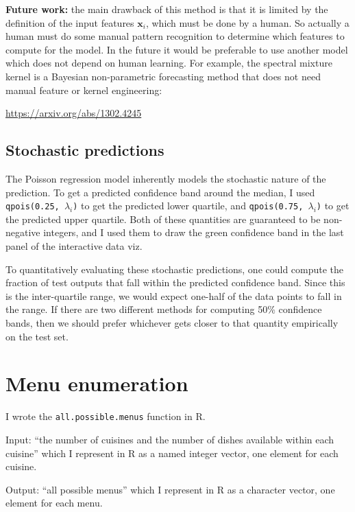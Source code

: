 \documentclass{article}
\begin{document}
\textbf{Future work:} the main drawback of this method is that it is
limited by the definition of the input features $\mathbf x_i$, which
must be done by a human. So actually a human must do some manual
pattern recognition to determine which features to compute for the
model. In the future it would be preferable to use another model which
does not depend on human learning. For example, the spectral mixture
kernel is a Bayesian non-parametric forecasting method that does not
need manual feature or kernel engineering:

\url{https://arxiv.org/abs/1302.4245}

\subsection{Stochastic predictions}

The Poisson regression model inherently models the stochastic nature
of the prediction. To get a predicted confidence band around the
median, I used \texttt{qpois(0.25, $\lambda_i$)} to get the predicted
lower quartile, and \texttt{qpois(0.75, $\lambda_i$)} to get the
predicted upper quartile. Both of these quantities are guaranteed to
be non-negative integers, and I used them to draw the green confidence
band in the last panel of the interactive data viz.

To quantitatively evaluating these stochastic predictions, one could
compute the fraction of test outputs that fall within the predicted
confidence band. Since this is the inter-quartile range, we would
expect one-half of the data points to fall in the range. If there are
two different methods for computing 50\% confidence bands, then we
should prefer whichever gets closer to that quantity empirically on
the test set.

\section{Menu enumeration}

I wrote the \texttt{all.possible.menus} function in R. 

Input: ``the number of cuisines and the number of dishes available
within each cuisine'' which I represent in R as a named integer
vector, one element for each cuisine.

Output: ``all possible menus'' which I represent in R as a character
vector, one element for each menu.
\end{document}

